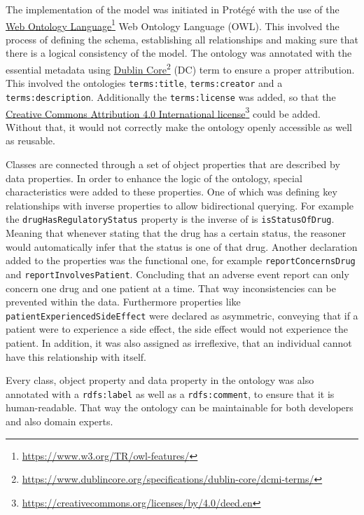 The implementation of the model was initiated in Protégé with the use of the \href{https://www.w3.org/TR/owl-features/}{Web Ontology Language}\footnote{\url{https://www.w3.org/TR/owl-features/}} Web Ontology Language (OWL). This involved the process of defining the schema, establishing all relationships and making sure that there is a logical consistency of the model.
The ontology was annotated with the essential metadata using \href{https://www.dublincore.org/specifications/dublin-core/dcmi-terms/}{Dublin Core}\footnote{\url{https://www.dublincore.org/specifications/dublin-core/dcmi-terms/}} (DC) term to ensure a proper attribution. This involved the ontologies \texttt{terms:title}, \texttt{terms:creator} and a \texttt{terms:description}. Additionally the \texttt{terms:license} was added, so that the \href{https://creativecommons.org/licenses/by/4.0/deed.en}{Creative Commons Attribution 4.0 International license}\footnote{\url{https://creativecommons.org/licenses/by/4.0/deed.en}} could be added. Without that, it would not correctly make the ontology openly accessible as well as reusable.

Classes are connected through a set of object properties that are described by data properties. In order to enhance the logic of the ontology, special characteristics were added to these properties. One of which was defining key relationships with inverse properties to allow bidirectional querying. For example the \texttt{drugHasRegulatoryStatus} property is the inverse of is \texttt{isStatusOfDrug}. Meaning that whenever stating that the drug has a certain status, the reasoner would automatically infer that the status is one of that drug. Another declaration added to the properties was the functional one, for example \texttt{reportConcernsDrug} and \texttt{reportInvolvesPatient}. Concluding that an adverse event report can only concern one drug and one patient at a time. That way inconsistencies can be prevented within the data. Furthermore properties like \texttt{patientExperiencedSideEffect} were declared as asymmetric, conveying that if a patient were to experience a side effect, the side effect would not experience the patient. In addition, it was also assigned as irreflexive, that an individual cannot have this relationship with itself.

Every class, object property and data property in the ontology was also annotated with a \texttt{rdfs:label} as well as a \texttt{rdfs:comment}, to ensure that it is human-readable. That way the ontology can be maintainable for both developers and also domain experts.

